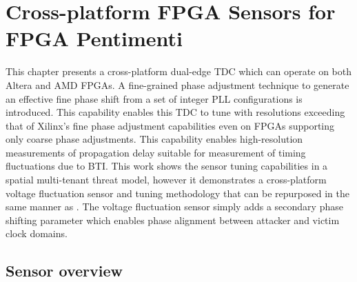\chapter{Cross-platform FPGA Sensors for FPGA Pentimenti}
\label{chap:fpga-sensor}

This chapter presents a cross-platform dual-edge TDC which can operate
on both Altera and AMD FPGAs. A fine-grained phase adjustment technique
to generate an effective fine phase shift from a set of integer PLL
configurations is introduced. This capability enables this TDC to tune
with resolutions exceeding that of Xilinx's fine phase adjustment
capabilities even on FPGAs supporting only coarse phase adjustments.
This capability enables high-resolution measurements of propagation
delay suitable for measurement of timing fluctuations due to BTI. This
work shows the sensor tuning capabilities in a spatial multi-tenant
threat model, however it demonstrates a cross-platform voltage
fluctuation sensor and tuning methodology that can be repurposed in the
same manner as \cite{drewes2024pentimento}. The voltage fluctuation
sensor simply adds a secondary phase shifting parameter which enables
phase alignment between attacker and victim clock domains.



\section{Sensor overview}

